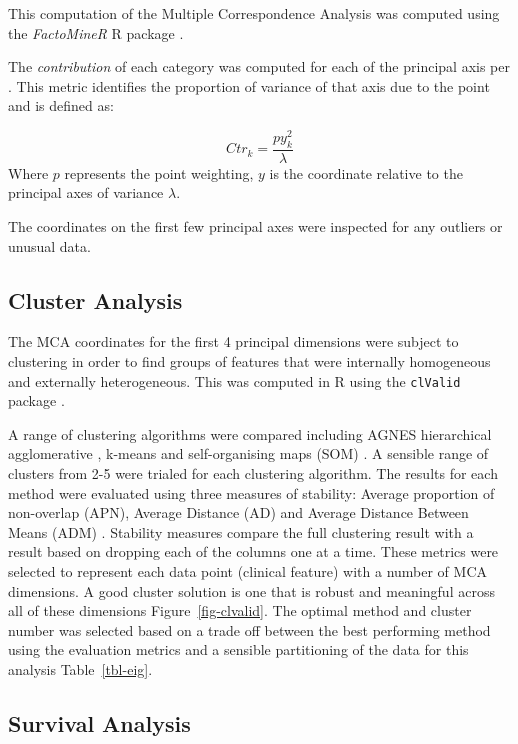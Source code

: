 \documentclass[
  authoryear,
  preprint,
  3p]{elsarticle}
\begin{document}
This computation of the Multiple Correspondence Analysis was computed
using the \emph{FactoMineR} R package \citep{factominer}.

The \emph{contribution} of each category was computed for each of the
principal axis per \citet{le2010multiple}. This metric identifies the
proportion of variance of that axis due to the point and is defined as:

\[
Ctr_k = \frac{py_k^2}{\lambda}
\] Where \(p\) represents the point weighting, \(y\) is the coordinate
relative to the principal axes of variance \(\lambda\).

The coordinates on the first few principal axes were inspected for any
outliers or unusual data.

\hypertarget{cluster-analysis}{%
\subsection{Cluster Analysis}\label{cluster-analysis}}

The MCA coordinates for the first 4 principal dimensions were subject to
clustering in order to find groups of features that were internally
homogeneous and externally heterogeneous. This was computed in R using
the \texttt{clValid} package \citep{clvalid}.

A range of clustering algorithms were compared including AGNES
hierarchical agglomerative \citep{kaufman2009finding}, k-means
\citep{hartigan1979algorithm} and self-organising maps (SOM)
\citep{kohonen2012self}. A sensible range of clusters from 2-5 were
trialed for each clustering algorithm. The results for each method were
evaluated using three measures of stability: Average proportion of
non-overlap (APN), Average Distance (AD) and Average Distance Between
Means (ADM) \citep{datta2003comparisons}. Stability measures compare the
full clustering result with a result based on dropping each of the
columns one at a time. These metrics were selected to represent each
data point (clinical feature) with a number of MCA dimensions. A good
cluster solution is one that is robust and meaningful across all of
these dimensions Figure~\ref{fig-clvalid}. The optimal method and
cluster number was selected based on a trade off between the best
performing method using the evaluation metrics and a sensible
partitioning of the data for this analysis Table~\ref{tbl-eig}.

\hypertarget{survival-analysis}{%
\subsection{Survival Analysis}\label{survival-analysis}}
\end{document}
